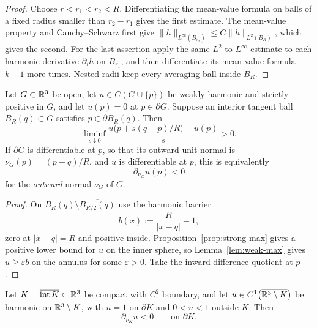 \begin{proof}
Choose $r<r_1<r_2<R$.  Differentiating the mean-value formula on balls of a
fixed radius smaller than $r_2-r_1$ gives the first estimate.  The mean-value
property and Cauchy--Schwarz first give
$\|h\|_{L^\infty(B_{r_2})}\le C\|h\|_{L^2(B_R)}$, which gives the second.
For the last assertion apply the same $L^2$-to-$L^\infty$ estimate to each
harmonic derivative $\partial_i h$ on $B_{r_1}$, and then differentiate its
mean-value formula $k-1$ more times.  Nested radii keep every averaging ball
inside $B_R$.
\end{proof}

\begin{proposition}\label{prop:hopf}
Let $G\subset\mathbb R^3$ be open, let
$u\in C(G\cup\{p\})$ be weakly harmonic and strictly positive in $G$, and
let $u(p)=0$ at $p\in\partial G$.  Suppose an interior tangent ball
$B_R(q)\subset G$ satisfies $p\in\partial B_R(q)$.  Then
\[
  \liminf_{s\downarrow0}
  \frac{u\bigl(p+s(q-p)/R\bigr)-u(p)}s>0.
\]
If $\partial G$ is differentiable at $p$, so that its outward unit normal is
$\nu_G(p)=(p-q)/R$, and $u$ is differentiable at $p$, this is equivalently
\begin{equation}\label{eq:hopf}
  \partial_{\nu_G}u(p)<0
\end{equation}
for the \emph{outward} normal $\nu_G$ of $G$.
\end{proposition}

\begin{proof}
On $B_R(q)\setminus\overline{B_{R/2}(q)}$ use the harmonic barrier
\begin{equation}\label{eq:hopf-barrier}
  b(x):=\frac{R}{|x-q|}-1,
\end{equation}
zero at $|x-q|=R$ and positive inside.  Proposition~\ref{prop:strong-max}
gives a positive lower bound for $u$ on the inner sphere, so
Lemma~\ref{lem:weak-max} gives $u\ge\varepsilon b$ on the annulus for some
$\varepsilon>0$.  Take the inward difference quotient at $p$.
\end{proof}

\begin{corollary}\label{cor:hopf-exterior}
Let $K=\overline{\operatorname{int}K}\subset\mathbb R^3$ be compact with $C^2$
boundary, and let
$u\in C^1\bigl(\overline{\mathbb R^3\setminus K}\bigr)$ be harmonic on
$\mathbb R^3\setminus K$, with $u=1$ on $\partial K$ and $0<u<1$ outside $K$.
Then
\[
  \partial_{\nu_K}u<0\qquad\text{on }\partial K.
\]
\end{corollary}

